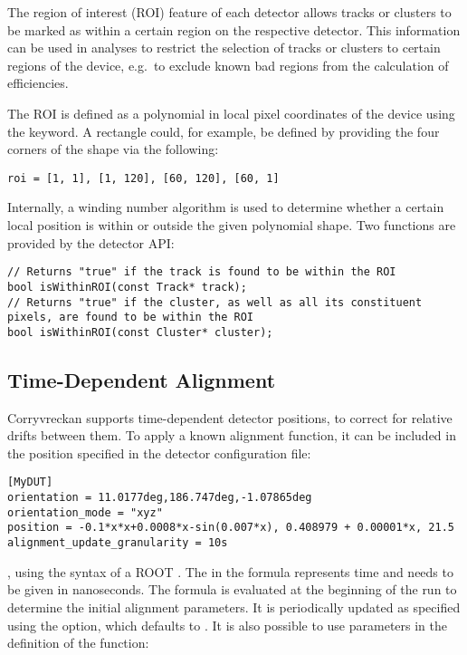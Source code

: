 The region of interest (ROI) feature of each detector allows tracks or clusters to be marked as within a certain region on the respective detector.
This information can be used in analyses to restrict the selection of tracks or clusters to certain regions of the device, e.g.\ to exclude known bad regions from the calculation of efficiencies.

The ROI is defined as a polynomial in local pixel coordinates of the device using the  keyword. A rectangle could, for example, be defined by providing the four corners of the shape via the following:

\begin{verbatim}
roi = [1, 1], [1, 120], [60, 120], [60, 1]
\end{verbatim}

Internally, a winding number algorithm is used to determine whether a certain local position is within or outside the given polynomial shape.
Two functions are provided by the detector API:

\begin{verbatim}
// Returns "true" if the track is found to be within the ROI
bool isWithinROI(const Track* track);
// Returns "true" if the cluster, as well as all its constituent pixels, are found to be within the ROI
bool isWithinROI(const Cluster* cluster);
\end{verbatim}

\subsection{Time-Dependent Alignment}
\label{sec:alignTimeDep}

Corryvreckan supports time-dependent detector positions, to correct for relative drifts between them. To apply a known alignment function, it can be included in the position specified in the detector configuration file:

\begin{verbatim}
[MyDUT]
orientation = 11.0177deg,186.747deg,-1.07865deg
orientation_mode = "xyz"
position = -0.1*x*x+0.0008*x-sin(0.007*x), 0.408979 + 0.00001*x, 21.5
alignment_update_granularity = 10s
\end{verbatim}

, using the syntax of a ROOT . The  in the formula represents time and needs to be given in nanoseconds. The formula is evaluated at the beginning of the run to determine the initial alignment parameters. It is periodically updated as specified using the  option, which defaults to . It is also possible to use parameters in the definition of the function:

